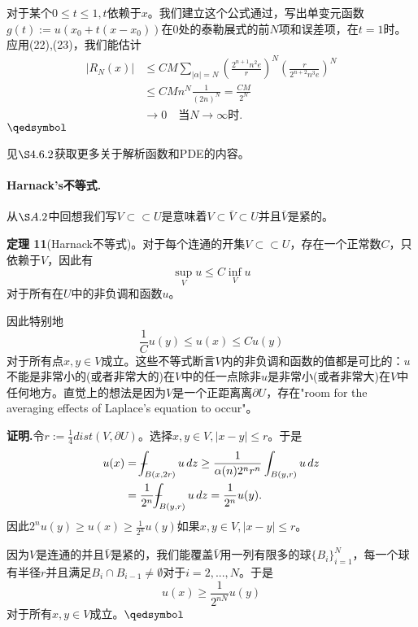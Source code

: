 \documentclass[leqno]{article}
\def\Xint#1{\mathchoice
	{\XXint\displaystyle\textstyle{#1}}%
	{\XXint\textstyle\scriptstyle{#1}}%
	{\XXint\scriptstyle\scriptscriptstyle{#1}}%
	{\XXint\scriptscriptstyle\scriptscriptstyle{#1}}%
	\!\int}
\def\XXint#1#2#3{{\setbox0=\hbox{$#1{#2#3}{\int}$ }
		\vcenter{\hbox{$#2#3$ }}\kern-.6\wd0}}
\def\dashint{\Xint-}
\numberwithin{equation}{subsection}%
\begin{document}
对于某个$0\leq t\leq 1,t$依赖于$x$。我们建立这个公式通过，写出单变元函数$g(t):=u(x_{0}+t(x-x_{0}))$在$0$处的泰勒展式的前$N$项和误差项，在$t=1$时。应用(22),(23)，我们能估计
\begin{equation*}
\begin{aligned}
|R_{N}(x)|&\leq CM\sum_{|\alpha|=N}\left(\frac{2^{n+1}n^{2}e}{r}\right)^{N}\left(\frac{r}{2^{n+2}n^{3}e}\right)^{N}\\
&\leq CMn^{N}\frac{1}{(2n)^{N}}=\frac{CM}{2^{N}}\\
&\rightarrow 0 \quad \text{当}N\rightarrow\infty\text{时}.
\end{aligned}
\end{equation*}
$\hfill\qedsymbol$
\par
见$\S 4.6.2$获取更多关于解析函数和PDE的内容。

\paragraph{Harnack's不等式.}
从$\S A.2$中回想我们写$V\subset\subset U$是意味着$V\subset \bar{V}\subset U$并且$\bar{V}$是紧的。
\par
\noindent\textbf{定理 11}(Harnack不等式)。对于每个连通的开集$V\subset\subset U$，存在一个正常数$C$，只依赖于$V$，因此有
\begin{equation*}
\sup_{V}u\leq C\inf_{V}u
\end{equation*}
对于所有在$U$中的非负调和函数$u$。
\par
因此特别地
\begin{equation*}
\frac{1}{C}u(y)\leq u(x)\leq Cu(y)
\end{equation*}
对于所有点$x,y\in V$成立。这些不等式断言$V$内的非负调和函数的值都是可比的：$u$不能是非常小的(或者非常大的)在$V$中的任一点除非$u$是非常小(或者非常大)在$V$中任何地方。直觉上的想法是因为$V$是一个正距离离$\partial U$，存在"room for the averaging effects of Laplace's equation to occur"。
\par
\noindent\textbf{证明.}令$r:=\frac{1}{4}dist(V,\partial U)$。选择$x,y\in V,|x-y|\leq r$。于是
\begin{equation*}
\begin{aligned}
u(x)&=\dashint_{B(x,2r)}u\,dz\geq\frac{1}{\alpha(n)2^{n}r^{n}}\int_{B(y,r)}u\,dz\\
&=\frac{1}{2^{n}}\dashint_{B(y,r)}u\,dz=\frac{1}{2^{n}}u(y).
\end{aligned}
\end{equation*}
因此$2^{n}u(y)\geq u(x)\geq \frac{1}{2^{n}}u(y)$如果$x,y\in V,|x-y|\leq r$。
\par
因为$V$是连通的并且$\bar{V}$是紧的，我们能覆盖$\bar{V}$用一列有限多的球$\{B_{i}\}_{i=1}^{N}$，每一个球有半径$r$并且满足$B_{i}\cap B_{i-1}\neq\emptyset$对于$i=2,...,N$。于是
\begin{equation*}
u(x)\geq\frac{1}{2^{nN}}u(y)
\end{equation*}
对于所有$x,y\in V$成立。$\hfill\qedsymbol$
\end{document}

